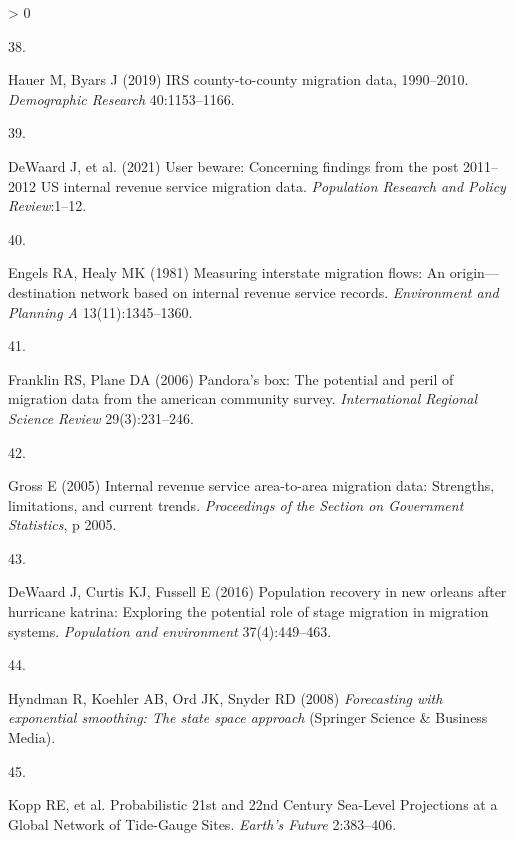 \documentclass[9pt,twocolumn,twoside,]{pnas-new}
\newlength{\csllabelwidth}
\newlength{\cslhangindent}
\newenvironment{CSLReferences}[3] %
 {%
  \setlength{\parindent}{0pt}
  \ifodd #1 \everypar{\setlength{\hangindent}{\cslhangindent}}\ignorespaces\fi
  \ifnum #2 > 0
  \setlength{\parskip}{#3\baselineskip}
  \fi
 }%
 {}
\newcommand{\CSLLeftMargin}[1]{\parbox[t]{\maxof{\widthof{#1}}{\csllabelwidth}}{#1}}
\newcommand{\CSLRightInline}[1]{\parbox[t]{\linewidth}{#1}}
\begin{document}
\begin{CSLReferences}{0}{0}
\leavevmode\hypertarget{ref-hauer2019irs}{}%
\CSLLeftMargin{38. }
\CSLRightInline{Hauer M, Byars J (2019) IRS county-to-county migration
data, 1990--2010. \emph{Demographic Research} 40:1153--1166.}

\leavevmode\hypertarget{ref-dewaard2021user}{}%
\CSLLeftMargin{39. }
\CSLRightInline{DeWaard J, et al. (2021) User beware: Concerning
findings from the post 2011--2012 US internal revenue service migration
data. \emph{Population Research and Policy Review}:1--12.}

\leavevmode\hypertarget{ref-engels1981measuring}{}%
\CSLLeftMargin{40. }
\CSLRightInline{Engels RA, Healy MK (1981) Measuring interstate
migration flows: An origin---destination network based on internal
revenue service records. \emph{Environment and Planning A}
13(11):1345--1360.}

\leavevmode\hypertarget{ref-franklin2006pandora}{}%
\CSLLeftMargin{41. }
\CSLRightInline{Franklin RS, Plane DA (2006) Pandora's box: The
potential and peril of migration data from the american community
survey. \emph{International Regional Science Review} 29(3):231--246.}

\leavevmode\hypertarget{ref-gross2005internal}{}%
\CSLLeftMargin{42. }
\CSLRightInline{Gross E (2005) Internal revenue service area-to-area
migration data: Strengths, limitations, and current trends.
\emph{Proceedings of the Section on Government Statistics}, p 2005.}

\leavevmode\hypertarget{ref-dewaard2016population}{}%
\CSLLeftMargin{43. }
\CSLRightInline{DeWaard J, Curtis KJ, Fussell E (2016) Population
recovery in new orleans after hurricane katrina: Exploring the potential
role of stage migration in migration systems. \emph{Population and
environment} 37(4):449--463.}

\leavevmode\hypertarget{ref-hyndman2008forecasting}{}%
\CSLLeftMargin{44. }
\CSLRightInline{Hyndman R, Koehler AB, Ord JK, Snyder RD (2008)
\emph{Forecasting with exponential smoothing: The state space approach}
(Springer Science \& Business Media).}

\leavevmode\hypertarget{ref-koppProbabilistic21st22nd}{}%
\CSLLeftMargin{45. }
\CSLRightInline{Kopp RE, et al. Probabilistic 21st and 22nd {Century
Sea}-{Level Projections} at a {Global Network} of {Tide}-{Gauge Sites}.
\emph{Earth's Future} 2:383--406.}

\end{CSLReferences}



% 
\end{document}

